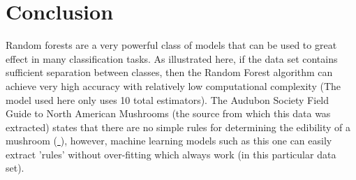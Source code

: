 \documentclass[]{article}
\begin{document}
\section{Conclusion}
Random forests are a very powerful class of models that can be used to great effect in many classification tasks. As illustrated here, if the data set contains sufficient separation between classes, then the Random Forest algorithm can achieve very high accuracy with relatively low computational complexity (The model used here only uses 10 total estimators). The Audubon Society Field Guide to North American Mushrooms (the source from which this data was extracted) states that there are no simple rules for determining the edibility of a mushroom (\href{https://www.kaggle.com/datasets/joebeachcapital/mushrooms/data}{ }), however, machine learning models such as this one can easily extract 'rules' without over-fitting which always work (in this particular data set).
\end{document}
